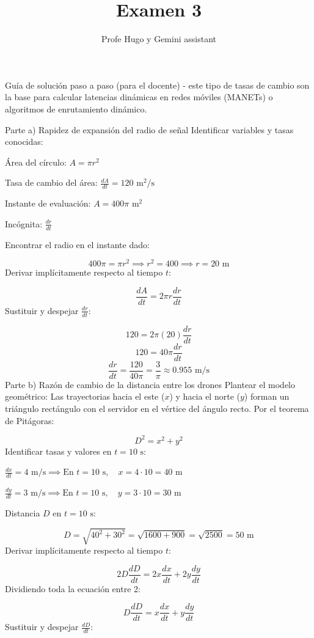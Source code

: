 \documentclass[11pt]{article} %
\title{Examen 3}
\author{Profe Hugo y Gemini assistant}
\begin{document}
\maketitle

 Guía de solución paso a paso (para el docente) - este tipo de tasas de cambio son la base para calcular latencias dinámicas en redes móviles (MANETs) o algoritmos de enrutamiento dinámico.

Parte a) Rapidez de expansión del radio de señal
Identificar variables y tasas conocidas:


Área del círculo: $A = \pi r^2$


Tasa de cambio del área: $\frac{dA}{dt} = 120\text{ m}^2/\text{s}$


Instante de evaluación: $A = 400\pi\text{ m}^2$


Incógnita: $\frac{dr}{dt}$


Encontrar el radio en el instante dado:


$$400\pi = \pi r^2 \implies r^2 = 400 \implies r = 20\text{ m}$$
Derivar implícitamente respecto al tiempo $t$:


$$\frac{dA}{dt} = 2\pi r \frac{dr}{dt}$$
Sustituir y despejar $\frac{dr}{dt}$:


$$120 = 2\pi (20) \frac{dr}{dt}$$
$$120 = 40\pi \frac{dr}{dt}$$
$$\frac{dr}{dt} = \frac{120}{40\pi} = \frac{3}{\pi} \approx 0.955\text{ m/s}$$
Parte b) Razón de cambio de la distancia entre los drones
Plantear el modelo geométrico: Las trayectorias hacia el este ($x$) y hacia el norte ($y$) forman un triángulo rectángulo con el servidor en el vértice del ángulo recto. Por el teorema de Pitágoras:


$$D^2 = x^2 + y^2$$
Identificar tasas y valores en $t = 10\text{ s}$:


$\frac{dx}{dt} = 4\text{ m/s} \implies \text{En } t = 10\text{ s}, \quad x = 4 \cdot 10 = 40\text{ m}$


$\frac{dy}{dt} = 3\text{ m/s} \implies \text{En } t = 10\text{ s}, \quad y = 3 \cdot 10 = 30\text{ m}$


Distancia $D$ en $t = 10\text{ s}$:


$$D = \sqrt{40^2 + 30^2} = \sqrt{1600 + 900} = \sqrt{2500} = 50\text{ m}$$
Derivar implícitamente respecto al tiempo $t$:


$$2D \frac{dD}{dt} = 2x \frac{dx}{dt} + 2y \frac{dy}{dt}$$
Dividiendo toda la ecuación entre 2:


$$D \frac{dD}{dt} = x \frac{dx}{dt} + y \frac{dy}{dt}$$
Sustituir y despejar $\frac{dD}{dt}$:
\end{document}
